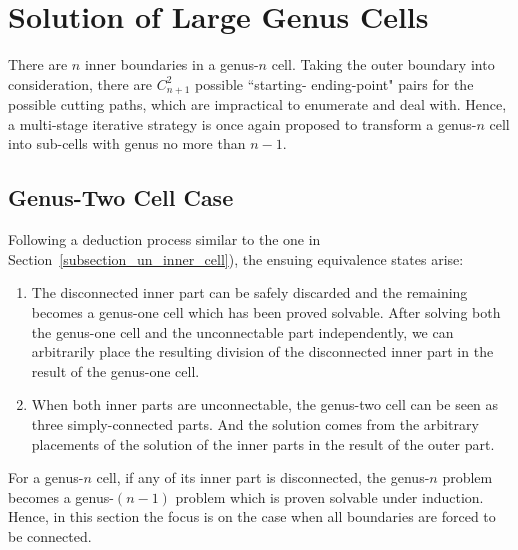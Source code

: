 \documentclass[journal]{IEEEtran}
\begin{document}
\section{Solution of Large Genus Cells}
\label{section_large_genus}
There are $n$ inner boundaries in a genus-$n$ cell. Taking the outer boundary into consideration, there are $C_{n+1}^2$ 
possible ``starting-  ending-point" pairs for the possible cutting paths, which are impractical to enumerate and deal with. 
Hence, a multi-stage iterative strategy is once again proposed to transform a genus-$n$ cell into sub-cells with genus no more than $n-1$. 

\subsection{Genus-Two Cell Case}
Following a deduction process similar to the one in Section~\ref{subsection_un_inner_cell}), the ensuing equivalence states arise:
\begin{enumerate}
\item The disconnected inner part can be safely discarded and the remaining becomes a genus-one cell which has been proved solvable. 
After solving both the genus-one cell and the unconnectable part independently, we can arbitrarily place the resulting division of the 
disconnected inner part in the result of the genus-one cell. 
\item When both inner parts are unconnectable, the genus-two cell can be seen as three simply-connected parts. And the solution comes from the arbitrary placements of the solution of the inner parts in the result of the outer part. 
\end{enumerate}

For a genus-$n$ cell, if any of its inner part is disconnected, the genus-$n$ problem becomes a genus-$(n-1)$ problem which is proven solvable under induction. Hence, in this section the focus is on the case when all boundaries are forced to be connected. 

\end{document}

